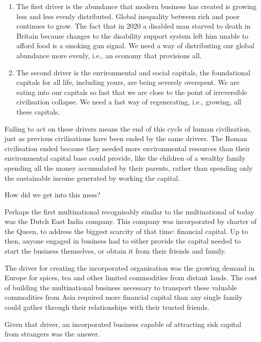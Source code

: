 \begin{enumerate}
\item The first driver is the abundance that modern business has created is growing less and less evenly distributed. Global inequality between rich and poor continues to grow. The fact that in 2020 a disabled man starved to death in Britain because changes to the disability support system left him unable to afford food is a smoking gun signal. We need a way of distributing our global abundance more evenly, i.e., an economy that provisions all. 


\item The second driver is the environmental and social capitals, the foundational capitals for all life, including yours, are being severely overspent. We are eating into our capitals so fast that we are close to the point of irreversible civilisation collapse. We need a fast way of regenerating, i.e., growing, all these capitals. 
\end{enumerate}


Failing to act on these drivers means the end of this cycle of human civilisation, just as  previous civilisations have been ended by the same drivers\cite{diamond-collapse}. The Roman civilisation ended because they needed more environmental resources than their environmental capital base could provide, like the children of a wealthy family spending all the money accumulated by their parents, rather than spending only the sustainable income generated by working the capital.


How did we get into this mess? 


Perhaps the first multinational recognisably similar to the multinational of today was the Dutch East India company. This company was incorporated by charter of the Queen, to address the biggest scarcity of that time: financial capital. Up to then, anyone engaged in business had to either provide the capital needed to start the business themselves, or obtain it from their friends and family.


The driver for creating the incorporated organisation was the growing demand in Europe for spices, tea and other limited commodities from distant lands. The cost of building the multinational business necessary to transport these valuable commodities from Asia required more financial capital than any single family could gather through their relationships with their trusted friends. 


Given that driver, an incorporated business capable of attracting risk capital from strangers was the answer.



